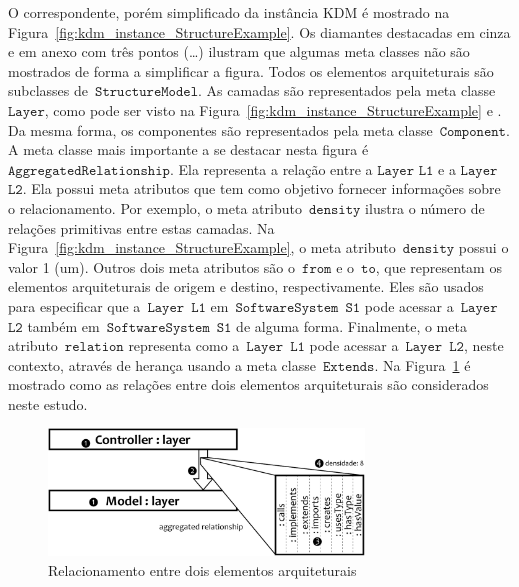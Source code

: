 O correspondente, porém simplificado da instância KDM é mostrado na Figura~\ref{fig:kdm_instance_StructureExample}. Os diamantes destacadas em cinza e em anexo com três pontos (\ldots) ilustram que algumas meta classes não são mostrados de forma a simplificar a figura. Todos os elementos arquiteturais são subclasses de~$\mathtt{StructureModel}$. As camadas são representados pela meta classe~$\mathtt{Layer}$, como pode ser visto na Figura~\ref{fig:kdm_instance_StructureExample}  e . Da mesma forma, os componentes são representados pela meta classe~$\mathtt{Component}$. A meta classe mais importante a se destacar nesta figura é $\mathtt{AggregatedRelationship}$. Ela representa a relação entre a $\mathtt{Layer}$ $\mathtt{L1}$ e a $\mathtt{Layer}$ $\mathtt{L2}$. Ela possui meta atributos que tem como objetivo fornecer informações sobre o relacionamento. Por exemplo, o meta atributo~$\mathtt{density}$ ilustra o número de relações primitivas entre estas camadas. Na Figura~\ref{fig:kdm_instance_StructureExample}, o meta atributo~$\mathtt{density}$ possui o valor 1 (um). Outros dois meta atributos são o~$\mathtt{from}$ e o~$\mathtt{to}$, que representam os elementos arquiteturais de origem e destino, respectivamente. Eles são usados para especificar que a~$\mathtt{Layer}$~$\mathtt{L1}$ em~$\mathtt{SoftwareSystem}$~$\mathtt{S1}$ pode acessar a~$\mathtt{Layer}$~$\mathtt{L2}$ também em~$\mathtt{SoftwareSystem}$~$\mathtt{S1}$ de alguma forma. Finalmente, o meta atributo~$\mathtt{relation}$ representa como a~$\mathtt{Layer}$~$\mathtt{L1}$ pode acessar a~$\mathtt{Layer}$~$\mathtt{L2}$, neste contexto, através de herança usando a meta classe~$\mathtt{Extends}$. Na Figura~\ref{fig:relationship_example_1} é mostrado como as relações entre dois elementos arquiteturais são considerados neste estudo.

\begin{figure}[!ht]
	\centering
	\includegraphics[width=3.3in]{images/relationshipExample1.pdf}
	\caption{Relacionamento entre dois elementos arquiteturais}
	\label{fig:relationship_example_1}
\end{figure}

